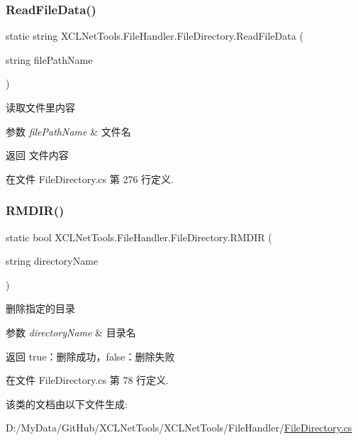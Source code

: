 \subsubsection{\texorpdfstring{Read\+File\+Data()}{ReadFileData()}}
{\footnotesize\ttfamily static string X\+C\+L\+Net\+Tools.\+File\+Handler.\+File\+Directory.\+Read\+File\+Data (\begin{DoxyParamCaption}\item[{string}]{file\+Path\+Name }\end{DoxyParamCaption})\hspace{0.3cm}{\ttfamily [static]}}



读取文件里内容 


\begin{DoxyParams}{参数}
{\em file\+Path\+Name} & 文件名\\
\hline
\end{DoxyParams}
\begin{DoxyReturn}{返回}
文件内容
\end{DoxyReturn}


在文件 File\+Directory.\+cs 第 276 行定义.

\mbox{\label{class_x_c_l_net_tools_1_1_file_handler_1_1_file_directory_aea79f469e66f1668c6bb4eff61bf9279}} 
\subsubsection{\texorpdfstring{R\+M\+D\+I\+R()}{RMDIR()}}
{\footnotesize\ttfamily static bool X\+C\+L\+Net\+Tools.\+File\+Handler.\+File\+Directory.\+R\+M\+D\+IR (\begin{DoxyParamCaption}\item[{string}]{directory\+Name }\end{DoxyParamCaption})\hspace{0.3cm}{\ttfamily [static]}}



删除指定的目录 


\begin{DoxyParams}{参数}
{\em directory\+Name} & 目录名\\
\hline
\end{DoxyParams}
\begin{DoxyReturn}{返回}
true：删除成功，false：删除失败
\end{DoxyReturn}


在文件 File\+Directory.\+cs 第 78 行定义.



该类的文档由以下文件生成\+:\begin{DoxyCompactItemize}
\item 
D\+:/\+My\+Data/\+Git\+Hub/\+X\+C\+L\+Net\+Tools/\+X\+C\+L\+Net\+Tools/\+File\+Handler/\hyperlink{_file_directory_8cs}{File\+Directory.\+cs}\end{DoxyCompactItemize}

